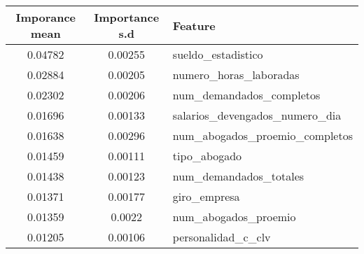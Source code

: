\begin{tabular}{ccp{14.5em}}
\toprule
\multicolumn{1}{p{4.865em}}{\textbf{Imporance mean}} & \multicolumn{1}{p{4.865em}}{\textbf{Importance s.d}} & \textbf{Feature} \\
\midrule
\midrule
\rowcolor[rgb]{ .961,  .961,  .961} 0.04782 & 0.00255 & sueldo_estadistico \\
0.02884 & 0.00205 & numero_horas_laboradas \\
\rowcolor[rgb]{ .961,  .961,  .961} 0.02302 & 0.00206 & num_demandados_completos \\
0.01696 & 0.00133 & salarios_devengados_numero_dia \\
\rowcolor[rgb]{ .961,  .961,  .961} 0.01638 & 0.00296 & num_abogados_proemio_completos \\
0.01459 & 0.00111 & tipo_abogado \\
\rowcolor[rgb]{ .961,  .961,  .961} 0.01438 & 0.00123 & num_demandados_totales \\
0.01371 & 0.00177 & giro_empresa \\
\rowcolor[rgb]{ .961,  .961,  .961} 0.01359 & 0.0022 & num_abogados_proemio \\
0.01205 & 0.00106 & personalidad_c_clv \\
\end{tabular}%
